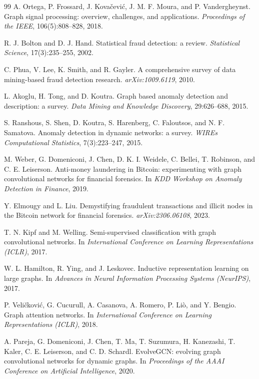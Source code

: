 \documentclass[11pt]{article}
\theoremstyle{definition}
\theoremstyle{remark}
\begin{document}
\begin{thebibliography}{99}
A. Ortega, P. Frossard, J. Kovačević, J. M. F. Moura, and P. Vandergheynst.
Graph signal processing: overview, challenges, and applications.
\emph{Proceedings of the IEEE}, 106(5):808--828, 2018.

R. J. Bolton and D. J. Hand.
Statistical fraud detection: a review.
\emph{Statistical Science}, 17(3):235--255, 2002.

C. Phua, V. Lee, K. Smith, and R. Gayler.
A comprehensive survey of data mining-based fraud detection research.
\emph{arXiv:1009.6119}, 2010.

L. Akoglu, H. Tong, and D. Koutra.
Graph based anomaly detection and description: a survey.
\emph{Data Mining and Knowledge Discovery}, 29:626--688, 2015.

S. Ranshous, S. Shen, D. Koutra, S. Harenberg, C. Faloutsos, and N. F. Samatova.
Anomaly detection in dynamic networks: a survey.
\emph{WIREs Computational Statistics}, 7(3):223--247, 2015.

M. Weber, G. Domeniconi, J. Chen, D. K. I. Weidele, C. Bellei, T. Robinson, and C. E. Leiserson.
Anti-money laundering in Bitcoin: experimenting with graph convolutional networks for financial forensics.
In \emph{KDD Workshop on Anomaly Detection in Finance}, 2019.

Y. Elmougy and L. Liu.
Demystifying fraudulent transactions and illicit nodes in the Bitcoin network for financial forensics.
\emph{arXiv:2306.06108}, 2023.

T. N. Kipf and M. Welling.
Semi-supervised classification with graph convolutional networks.
In \emph{International Conference on Learning Representations (ICLR)}, 2017.

W. L. Hamilton, R. Ying, and J. Leskovec.
Inductive representation learning on large graphs.
In \emph{Advances in Neural Information Processing Systems (NeurIPS)}, 2017.

P. Veličković, G. Cucurull, A. Casanova, A. Romero, P. Liò, and Y. Bengio.
Graph attention networks.
In \emph{International Conference on Learning Representations (ICLR)}, 2018.

A. Pareja, G. Domeniconi, J. Chen, T. Ma, T. Suzumura, H. Kanezashi, T. Kaler, C. E. Leiserson, and C. D. Schardl.
EvolveGCN: evolving graph convolutional networks for dynamic graphs.
In \emph{Proceedings of the AAAI Conference on Artificial Intelligence}, 2020.


\end{thebibliography}
\end{document}
